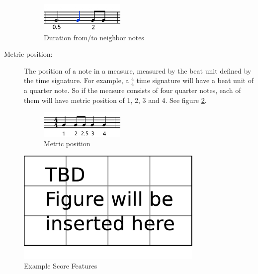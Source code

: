 \begin{description}
      \begin{figure}[tp]
         \begin{center}
            \includegraphics[width=0.4\textwidth]{fig/duration}
         \end{center}
         \caption{Duration from/to neighbor notes}
         \label{fig:duration}
      \end{figure}
   \item [Metric position:] The position of a note in a measure, measured by the beat unit defined by the time signature. For example, a $^4_4$ time signature will have a beat unit of a quarter note. So if the measure consists of four quarter notes, each of them will have metric position of 1, 2, 3 and 4. See figure \ref{fig:metrical}.

   \begin{figure}[tp]
      \begin{center}
         \includegraphics[width=0.4\textwidth]{fig/metrical}
      \end{center}
      \caption{Metric position}
      \label{fig:metrical}
   \end{figure}
      \end{description}

   \begin{figure}[tp]
      \begin{center}
         \includegraphics[width=0.8\textwidth]{fig/TBDFigure}
      \end{center}
      \caption{Example Score Features}
      \label{fig:expScoreFeat}
   \end{figure}
